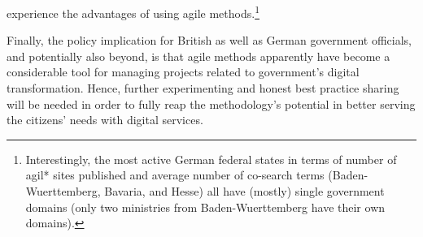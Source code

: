 experience the advantages of using agile methods.\footnote{Interestingly, the most active German federal states in terms of number of agil* sites published and average number of co-search terms (Baden-Wuerttemberg, Bavaria, and Hesse) all have (mostly) single government domains (only two ministries from Baden-Wuerttemberg have their own domains).}

Finally, the policy implication for British as well as German government officials, and potentially also beyond, is that agile methods apparently have become a considerable tool for managing projects related to government's digital transformation. Hence, further experimenting and honest best practice sharing will be needed in order to fully reap the methodology's potential in better serving the citizens' needs with digital services. 

